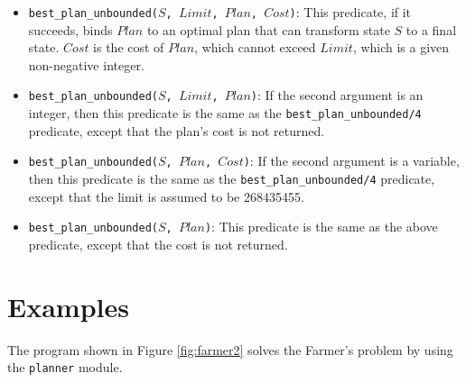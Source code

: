 \begin{itemize}
\item \texttt{best\_plan\_unbounded($S$, $Limit$, $Plan$, $Cost$)}: This predicate, if it succeeds, binds $Plan$ to an optimal plan that can transform state $S$ to a final state. $Cost$ is the cost of $Plan$, which cannot exceed $Limit$, which is a given non-negative integer.

\item \texttt{best\_plan\_unbounded($S$, $Limit$, $Plan$)}: If the second argument is an integer, then this predicate is the same as the \texttt{best\_plan\_unbounded/4} predicate, except that the plan's cost is not returned.

\item \texttt{best\_plan\_unbounded($S$, $Plan$, $Cost$)}: If the second argument is a variable, then this predicate is the same as the \texttt{best\_plan\_unbounded/4} predicate, except that the limit is assumed to be 268435455.

\item \texttt{best\_plan\_unbounded($S$, $Plan$)}: This predicate is the same as the above predicate, except that the cost is not returned.
\end{itemize}

\section{Examples}
The program shown in Figure \ref{fig:farmer2} solves the Farmer's problem by using the \texttt{planner} module. 

